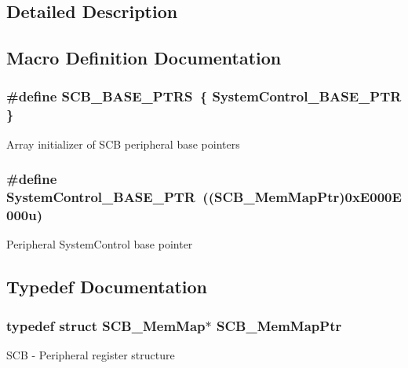\subsection{Detailed Description}


\subsection{Macro Definition Documentation}
\hypertarget{group___s_c_b___peripheral_gaf74b4dbfa6fd0a5607314e170a0c1d48}{}
\subsubsection[{S\+C\+B\+\_\+\+B\+A\+S\+E\+\_\+\+P\+T\+R\+S}]{\setlength{\rightskip}{0pt plus 5cm}\#define S\+C\+B\+\_\+\+B\+A\+S\+E\+\_\+\+P\+T\+R\+S~\{ {\bf System\+Control\+\_\+\+B\+A\+S\+E\+\_\+\+P\+T\+R} \}}\label{group___s_c_b___peripheral_gaf74b4dbfa6fd0a5607314e170a0c1d48}
Array initializer of S\+C\+B peripheral base pointers \hypertarget{group___s_c_b___peripheral_gaf22864785770f832103e904244e078cb}{}
\subsubsection[{System\+Control\+\_\+\+B\+A\+S\+E\+\_\+\+P\+T\+R}]{\setlength{\rightskip}{0pt plus 5cm}\#define System\+Control\+\_\+\+B\+A\+S\+E\+\_\+\+P\+T\+R~(({\bf S\+C\+B\+\_\+\+Mem\+Map\+Ptr})0x\+E000\+E000u)}\label{group___s_c_b___peripheral_gaf22864785770f832103e904244e078cb}
Peripheral System\+Control base pointer 

\subsection{Typedef Documentation}
\hypertarget{group___s_c_b___peripheral_ga08aca299c99cac47121d9e64e7b8e1cf}{}
\subsubsection[{S\+C\+B\+\_\+\+Mem\+Map\+Ptr}]{\setlength{\rightskip}{0pt plus 5cm}typedef struct {\bf S\+C\+B\+\_\+\+Mem\+Map}$\ast$ {\bf S\+C\+B\+\_\+\+Mem\+Map\+Ptr}}\label{group___s_c_b___peripheral_ga08aca299c99cac47121d9e64e7b8e1cf}
S\+C\+B -\/ Peripheral register structure 